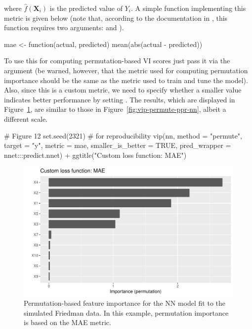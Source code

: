 where $\widehat{f}\left(\boldsymbol{X}_i\right)$ is the predicted value of $Y_i$. A simple function implementing this metric is given below (note that, according to the documentation in , this function requires two arguments:  and ).

\begin{example}
mae <- function(actual, predicted) {
  mean(abs(actual - predicted))
}
\end{example}

To use this for computing permutation-based VI scores just pass it via the  argument (be warned, however, that the metric used for computing permutation importance should be the same as the metric used to train and tune the model). Also, since this is a custom metric, we need to specify whether a smaller value indicates better performance by setting . The results, which are displayed in Figure~\ref{fig:vip-nn-mae}, are similar to those in Figure~\ref{fig:vip-permute-ppr-nn}, albeit a different scale. 

\begin{example}
# Figure 12
set.seed(2321)  # for reproducibility
vip(nn, method = "permute", target = "y", metric = mae,
    smaller_is_better = TRUE, pred_wrapper = nnet:::predict.nnet) +
  ggtitle("Custom loss function: MAE")
\end{example}

\begin{figure}[!htb]
  \centering
  \includegraphics[width=1\linewidth]{figures/vip-permute-nn-mae}
  \caption{Permutation-based feature importance for the NN model fit to the simulated Friedman data. In this example, permutation importance is based on the MAE metric.}
  \label{fig:vip-nn-mae}
\end{figure}

